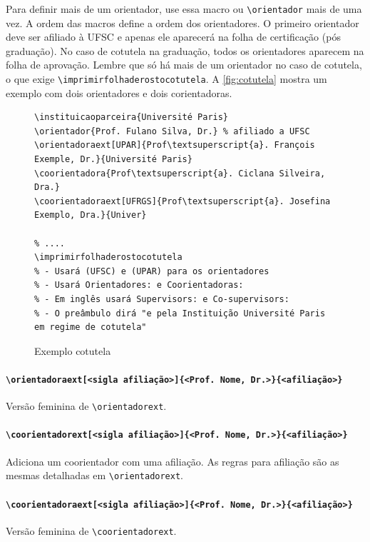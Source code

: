 \documentclass[embeddedlogo]{ufsc-thesis-rn46-2019}
\newcommand{\lacmd}[1]{\texttt{\textbackslash{}#1}}
\begin{document}
Para definir mais de um orientador, use essa macro ou \lacmd{orientador} mais de
uma vez. A ordem das macros define a ordem dos orientadores. O primeiro
orientador deve ser afiliado à UFSC e apenas ele aparecerá na folha de
certificação (pós graduação). No caso de cotutela na graduação, todos os
orientadores aparecem na folha de aprovação. Lembre que só há mais de um
orientador no caso de cotutela, o que exige
\lacmd{imprimirfolhaderostocotutela}. A \autoref{fig:cotutela} mostra um exemplo
com dois orientadores e dois corientadoras.

\begin{figure}[tb]
  \centering
\begin{verbatim}
\instituicaoparceira{Université Paris}
\orientador{Prof. Fulano Silva, Dr.} % afiliado a UFSC
\orientadoraext[UPAR]{Prof\textsuperscript{a}. François Exemple, Dr.}{Université Paris}
\coorientadora{Prof\textsuperscript{a}. Ciclana Silveira, Dra.}
\coorientadoraext[UFRGS]{Prof\textsuperscript{a}. Josefina Exemplo, Dra.}{Univer}

% ....
\imprimirfolhaderostocotutela
% - Usará (UFSC) e (UPAR) para os orientadores
% - Usará Orientadores: e Coorientadoras:
% - Em inglês usará Supervisors: e Co-supervisors:
% - O preâmbulo dirá "e pela Instituição Université Paris em regime de cotutela"
\end{verbatim}
  \caption{Exemplo cotutela}
  \label{fig:cotutela}
\end{figure}

\paragraph*{\lacmd{orientadoraext[<sigla afiliação>]\{<Prof. Nome, Dr.>\}\{<afiliação>\}}}
Versão feminina de \lacmd{orientadorext}.

\paragraph*{\lacmd{coorientadorext[<sigla afiliação>]\{<Prof. Nome, Dr.>\}\{<afiliação>\}}}
Adiciona um coorientador com uma afiliação. As regras para afiliação são as mesmas
detalhadas em \lacmd{orientadorext}.

\paragraph*{\lacmd{coorientadoraext[<sigla afiliação>]\{<Prof. Nome, Dr.>\}\{<afiliação>\}}}
Versão feminina de \lacmd{coorientadorext}.
\end{document}

